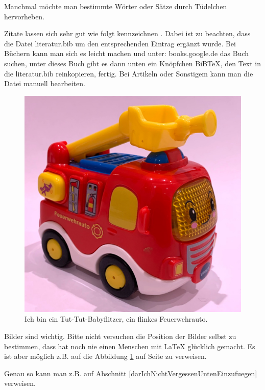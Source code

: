 \documentclass[a4paper, 12pt]{article}
\begin{document}
Manchmal möchte man bestimmte Wörter oder Sätze durch \glqq Tüdelchen\grqq{} hervorheben.

Zitate lassen sich sehr gut wie folgt kennzeichnen \cite[S.~22f]{IQSH2016APVO}. Dabei ist zu beachten, dass die Datei literatur.bib um den entsprechenden Eintrag ergänzt wurde. Bei Büchern kann man sich es leicht machen und unter: books.google.de das Buch suchen, unter  dieses Buch\grqq{} gibt es dann unten ein Knöpfchen \glqq BiBTeX\grqq{}, den Text in die literatur.bib reinkopieren, fertig. Bei Artikeln oder Sonstigem kann man die Datei manuell bearbeiten.

\begin{figure}[hbtp]
	\centering
	\includegraphics{img/tuttut.jpg}
	\caption{Ich bin ein Tut-Tut-Babyflitzer, ein flinkes Feuerwehrauto.}
	\label{egalWasHauptsacheEindeutig}
\end{figure}

Bilder sind wichtig. Bitte nicht versuchen die Position der Bilder selbst zu bestimmen, dass hat noch nie einen Menschen mit \LaTeX{} glücklich gemacht. Es ist aber möglich z.B. auf die Abbildung \ref{egalWasHauptsacheEindeutig} auf Seite \pageref{egalWasHauptsacheEindeutig} zu verweisen.

Genau so kann man z.B. auf Abschnitt \ref{darIchNichtVergessenUntenEinzufuegen} verweisen.
\end{document}
